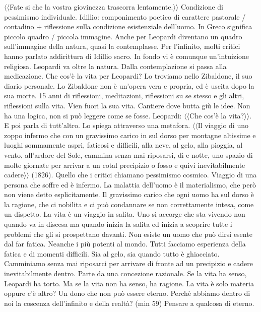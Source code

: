 \documentclass{article}
\begin{document}
    $\langle \langle$Fate si che la vostra giovinezza trascorra lentamente.$\rangle \rangle$
    \newline
    Condizione di pessimismo individuale.
    Idillio: componimento poetico di carattere pastorale / contadino + riflessione sulla condizione esistenziale dell'uomo.
    In Greco significa piccolo quadro / piccola immagine. Anche per Leopardi diventano un quadro sull'immagine della natura, quasi la
    contemplasse.
    Per l'infinito, molti critici hanno parlato addirittura di Idillio sacro. In fondo vi è comunque un'intuizione religiosa.
    Leopardi va oltre la natura. Dalla contemplazione si passa alla medicazione.
    \newline
    Che cos'è la vita per Leopardi? Lo troviamo nello Zibaldone, il suo diario personale. Lo Zibaldone non è un'opera vera e propria,
    ed è uscita dopo la sua morte. 15 anni di riflessioni, meditazioni, riflessioni su se stesso e gli altri, riflessioni sulla vita.
    Vien fuori la sua vita. Cantiere dove butta giù le idee. Non ha una logica, non si può leggere come se fosse.
    \newline
    Leopardi: $\langle \langle$Che cos'è la vita?$\rangle \rangle$. E poi parla di tutt'altro. Lo spiega attraverso una metafora. $\langle \langle$Il viaggio di uno zoppo infermo che con
    un gravissimo carico in sul dorso per montagne altissime e luoghi sommamente aspri, faticosi e difficili, alla neve, al gelo,
    alla pioggia, al vento, all'ardore del Sole, cammina senza mai riposarsi, dì e notte, uno spazio di molte giornate per arrivar a un
    cotal precipizio o fosso e quivi inevitabilmente cadere$\rangle \rangle$ (1826).
    Quello che i critici chiamano pessimismo cosmico.
    \newline
    Viaggio di una persona che soffre ed è infermo. La malattia dell'uomo è il materialismo, che però non viene detto esplicitamente.
    Il gravissimo carico che ogni uomo ha sul dorso è la ragione, che ci nobilita e ci può condannare se non correttamente intesa, come un dispetto.
    La vita è un viaggio in salita. Uno si accorge che sta vivendo non quando va in discesa ma quando inizia la salita ed inizia a scoprire tutte
    i problemi che gli si prospettano davanti. Non esiste un uomo che può dirsi esente dal far fatica. Neanche i più potenti al mondo.
    Tutti facciamo esperienza della fatica e di momenti difficili. Sia al gelo, sia quando tutto è ghiacciato.
    Camminiamo senza mai riposarci per arrivare di fronte ad un precipizio e cadere inevitabilmente dentro.
    Parte da una concezione razionale.
    \newline
    Se la vita ha senso, Leopardi ha torto. Ma se la vita non ha senso, ha ragione. La vita è solo materia oppure c'è altro?
    Un dono che non può essere eterno. Perchè abbiamo dentro di noi la coscenza dell'infinito e della realtà? (min 59) Pensare a qualcosa
    di eterno.
\end{document}
